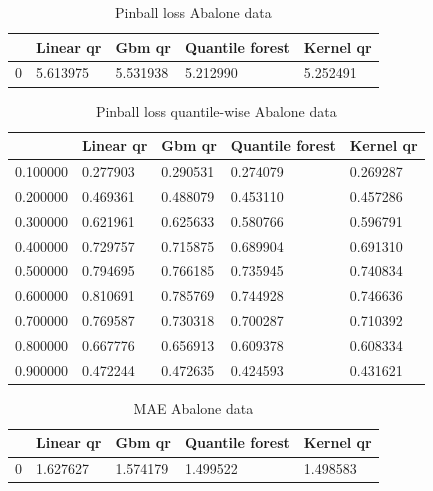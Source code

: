 \begin{table}
    \caption{Pinball loss Abalone data}
\begin{tabular}{lllll}
    \toprule
     & Linear qr & Gbm qr & Quantile forest & Kernel qr \\
    \midrule
    0 & 5.613975 & 5.531938 & 5.212990 & 5.252491 \\
    \bottomrule
    \end{tabular}
\end{table}
    
\begin{table}
    \caption{Pinball loss quantile-wise Abalone data}
    \begin{tabular}{lllll}
    \toprule
     & Linear qr & Gbm qr & Quantile forest & Kernel qr \\
    \midrule
    0.100000 & 0.277903 & 0.290531 & 0.274079 & 0.269287 \\
    0.200000 & 0.469361 & 0.488079 & 0.453110 & 0.457286 \\
    0.300000 & 0.621961 & 0.625633 & 0.580766 & 0.596791 \\
    0.400000 & 0.729757 & 0.715875 & 0.689904 & 0.691310 \\
    0.500000 & 0.794695 & 0.766185 & 0.735945 & 0.740834 \\
    0.600000 & 0.810691 & 0.785769 & 0.744928 & 0.746636 \\
    0.700000 & 0.769587 & 0.730318 & 0.700287 & 0.710392 \\
    0.800000 & 0.667776 & 0.656913 & 0.609378 & 0.608334 \\
    0.900000 & 0.472244 & 0.472635 & 0.424593 & 0.431621 \\
    \bottomrule
    \end{tabular}
\end{table}
    
\begin{table}
    \caption{MAE Abalone data}
    \begin{tabular}{lllll}
    \toprule
     & Linear qr & Gbm qr & Quantile forest & Kernel qr \\
    \midrule
    0 & 1.627627 & 1.574179 & 1.499522 & 1.498583 \\
    \bottomrule
    \end{tabular}
\end{table} 

